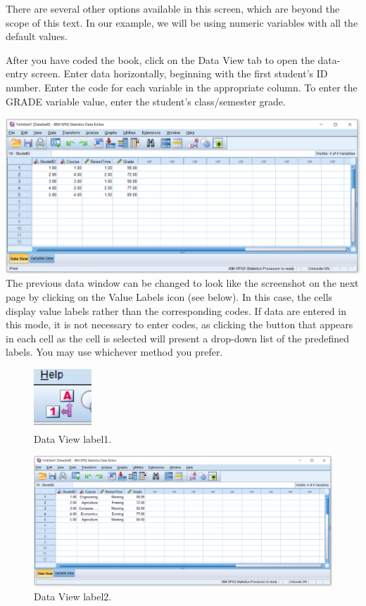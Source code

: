 \documentclass[
]{book}
\begin{document}
There are several other options available in this screen, which are beyond the scope of this text. In our example, we will be using numeric variables with all the default values.

After you have coded the book, click on the Data View tab to open the data-entry screen. Enter data horizontally, beginning with the first student's ID number. Enter the code for each variable in the appropriate column. To enter the GRADE variable value, enter the student's class/semester grade.

\includegraphics{dataview.png}
The previous data window can be changed to look like the screenshot on the next page by clicking on the Value Labels icon (see below). In this case, the cells display value labels rather than the corresponding codes. If data are entered in this mode, it is not necessary to enter codes, as clicking the button that appears in each cell as the cell is selected will present a drop-down list of the predefined labels. You may use whichever method you prefer.

\begin{figure}
\centering
\includegraphics{valuelabels.png}
\caption{Data View label1.}
\end{figure}

\begin{figure}
\centering
\includegraphics{Valuelabels2.png}
\caption{Data View label2.}
\end{figure}
\end{document}
